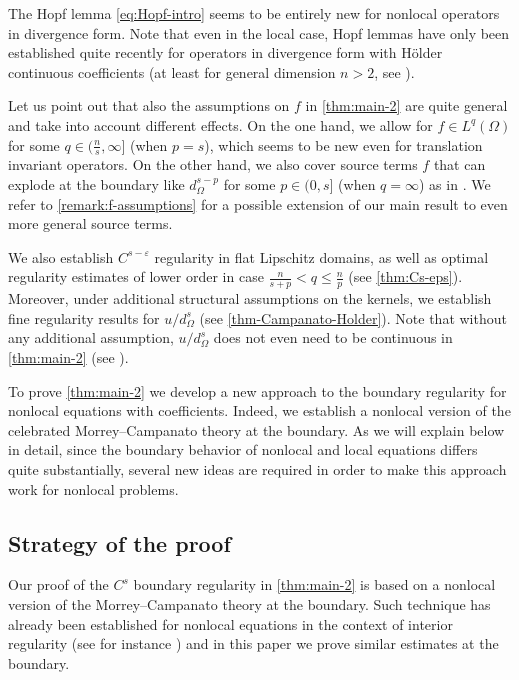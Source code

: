 \documentclass[11pt,reqno]{amsart}
\theoremstyle{plain}
\theoremstyle{definition}
\numberwithin{equation}{section}
\newcommand{\eps}{\varepsilon}
\newcommand{\1}{\mathbbm{1}}
\begin{document}
The Hopf lemma \eqref{eq:Hopf-intro} seems to be entirely new for nonlocal operators in divergence form. Note that even in the local case, Hopf lemmas  have only been established quite recently for operators in divergence form with H\"older continuous coefficients (at least for general dimension $n > 2$, see \cite{Sab15,Ros19}). 

Let us point out that also the assumptions on $f$ in \autoref{thm:main-2} are quite general and take into account different effects. On the one hand, we allow for $f \in L^q(\Omega)$ for some $q \in (\frac{n}{s}, \infty]$ (when $p = s$), which seems to be new even for translation invariant operators. On the other hand, we also cover source terms $f$ that can explode at the boundary like $d_{\Omega}^{s-p}$ for some $p \in (0,s]$ (when $q = \infty$) as in \cite{FeRo24}. We refer to \autoref{remark:f-assumptions} for a possible extension of our main result to even more general source terms.

We also establish $C^{s-\eps}$ regularity in flat Lipschitz domains, as well as optimal regularity estimates of lower order in case $\frac{n}{s+p}<q \leq \frac{n}{p}$ (see \autoref{thm:Cs-eps}). Moreover, under additional structural assumptions on the kernels, we establish fine regularity results for $u/d_{\Omega}^s$ (see \autoref{thm-Campanato-Holder}). Note that without any additional assumption, $u/d_{\Omega}^s$ does not even need to be continuous in \autoref{thm:main-2} (see \cite{RoWe24}).


To prove \autoref{thm:main-2} we develop a new approach to the boundary regularity for nonlocal equations with coefficients. Indeed, we establish a nonlocal version of the celebrated Morrey--Campanato theory at the boundary. As we will explain below in detail, since the boundary behavior of nonlocal and local equations differs quite substantially, several new ideas are required in order to make this approach work for nonlocal problems.






\subsection{Strategy of the proof}

Our proof of the $C^s$ boundary regularity in \autoref{thm:main-2} is based on a nonlocal version of the Morrey--Campanato theory at the boundary. Such technique has already been established for nonlocal equations in the context of interior regularity (see for instance \cite{KMS15,KNS22}) and in this paper we prove  similar estimates at the boundary. 
\end{document}
